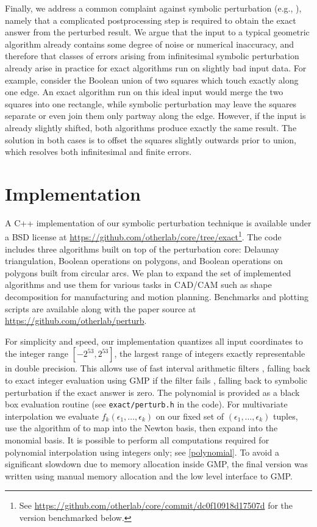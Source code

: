 \documentclass[11pt]{article}
\begin{document}
Finally, we address a common complaint against symbolic perturbation (e.g., \cite{burnikel1994degeneracy}), namely that a complicated postprocessing step is required to obtain the
exact answer from the perturbed result.  We argue that the input to a typical geometric algorithm already contains some degree of noise or numerical inaccuracy, and therefore that
classes of errors arising from infinitesimal symbolic perturbation already arise in practice for exact algorithms run on slightly bad input data.  For example, consider the Boolean
union of two squares which touch exactly along one edge.  An exact algorithm run on this ideal input would merge the two squares into one rectangle, while symbolic perturbation may
leave the squares separate or even join them only partway along the edge.  However, if the input is already slightly shifted, both algorithms produce exactly the same result.
The solution in both cases is to offset the squares slightly outwards prior to union, which resolves both infinitesimal and finite errors.

\section{Implementation}

A C++ implementation of our symbolic perturbation technique is available under a BSD license at \url{https://github.com/otherlab/core/tree/exact}\footnote{See 
\url{https://github.com/otherlab/core/commit/dc0f10918d17507d} for the version benchmarked below.}.  The code includes three algorithms built on top of the perturbation
core: Delaunay triangulation, Boolean operations on polygons, and Boolean operations on polygons built from circular arcs.  We plan to expand the set of implemented algorithms
and use them for various tasks in CAD/CAM such as shape decomposition for manufacturing and motion planning.  Benchmarks and plotting scripts are available along with the
paper source at \url{https://github.com/otherlab/perturb}.

For simplicity and speed, our implementation quantizes all input coordinates to the integer range $[-2^{53},2^{53}]$, the largest range of integers exactly representable in
double precision.  This allows use of fast interval arithmetic filters \cite{bronnimann2001interval}, falling back to exact integer evaluation using GMP if the filter fails \cite{granlund2012gmp},
falling back to symbolic perturbation if the exact answer is zero.  The polynomial is provided as a black box evaluation routine (see \verb+exact/perturb.h+ in the code).  For multivariate
interpolation we evaluate $f_k(\epsilon_1, \ldots, \epsilon_k)$ on our fixed set of $(\epsilon_1, \ldots, \epsilon_k)$ tuples, use the algorithm of \cite{neidinger2009multivariable}
to map into the Newton basis, then expand into the monomial basis.  It is possible to perform all computations required for polynomial interpolation using integers only; see \autoref{polynomial}.
To avoid a significant slowdown due to memory allocation inside GMP, the final version was written using manual memory allocation and the low level interface to GMP.
\end{document}
